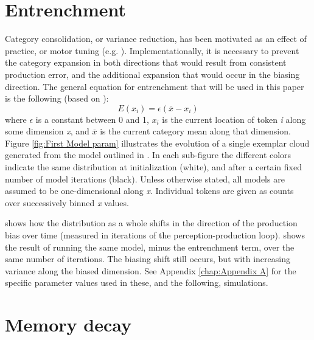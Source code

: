 \section{Entrenchment}

Category consolidation, or variance reduction, has been motivated
as an effect of practice, or motor tuning (e.g. \citealp{saltzman1989dynamical}).
Implementationally, it is necessary to prevent the category expansion
in both directions that would result from consistent production error,
and the additional expansion that would occur in the biasing direction.
The general equation for entrenchment that will be used in this paper
is the following (based on \citealt{Pierrehumbert2000}):
\begin{equation}
E(x_{i})=\epsilon(\bar{x}-x_{i})\label{eq:Entrenchment}
\end{equation}
where $\epsilon$ is a constant between 0 and 1, $x_{i}$ is the current
location of token \emph{i} along some dimension \emph{x}, and $\overline{x}$
is the current category mean along that dimension. Figure \ref{fig:First Model param}
illustrates the evolution of a single exemplar cloud generated from
the model outlined in . In
each sub-figure the different colors indicate the same distribution
at initialization (white), and after a certain fixed number of model
iterations (black). Unless otherwise stated, all models are assumed
to be one-dimensional along \emph{x}. Individual tokens are given
as counts over successively binned \emph{x} values. 

 shows how the distribution as
a whole shifts in the direction of the production bias over time (measured
in iterations of the perception-production loop). 
shows the result of running the same model, minus the entrenchment
term, over the same number of iterations. The biasing shift still
occurs, but with increasing variance along the biased dimension. See
Appendix \ref{chap:Appendix A} for the specific parameter values
used in these, and the following, simulations. 

\section{Memory decay}

